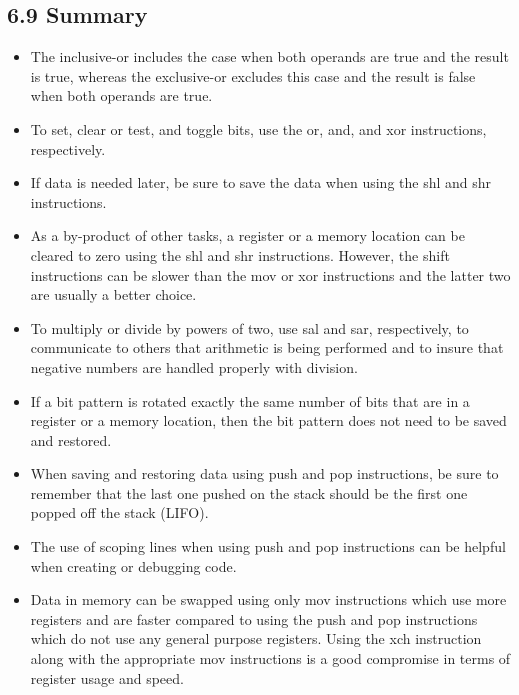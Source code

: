 \documentclass[10pt]{article}
\begin{document}
\subsection*{6.9 Summary}
\begin{itemize}
  \item The inclusive-or includes the case when both operands are true and the result is true, whereas the exclusive-or excludes this case and the result is false when both operands are true.
  \item To set, clear or test, and toggle bits, use the or, and, and xor instructions, respectively.
  \item If data is needed later, be sure to save the data when using the shl and shr instructions.
  \item As a by-product of other tasks, a register or a memory location can be cleared to zero using the shl and shr instructions. However, the shift instructions can be slower than the mov or xor instructions and the latter two are usually a better choice.
  \item To multiply or divide by powers of two, use sal and sar, respectively, to communicate to others that arithmetic is being performed and to insure that negative numbers are handled properly with division.
  \item If a bit pattern is rotated exactly the same number of bits that are in a register or a memory location, then the bit pattern does not need to be saved and restored.
  \item When saving and restoring data using push and pop instructions, be sure to remember that the last one pushed on the stack should be the first one popped off the stack (LIFO).
  \item The use of scoping lines when using push and pop instructions can be helpful when creating or debugging code.
  \item Data in memory can be swapped using only mov instructions which use more registers and are faster compared to using the push and pop instructions which do not use any general purpose registers. Using the xch instruction along with the appropriate mov instructions is a good compromise in terms of register usage and speed.
\end{itemize}
\end{document}
